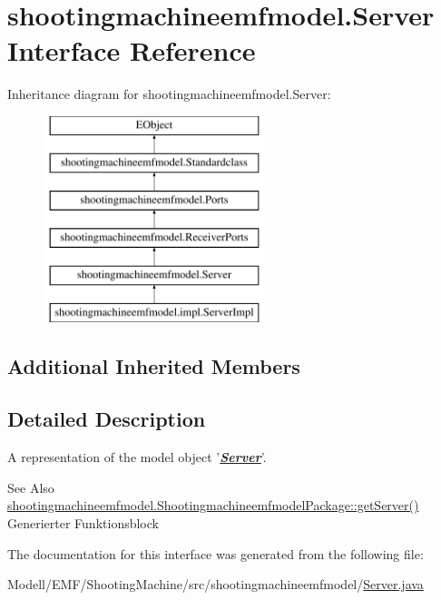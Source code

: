 \hypertarget{interfaceshootingmachineemfmodel_1_1_server}{\section{shootingmachineemfmodel.\-Server Interface Reference}
\label{interfaceshootingmachineemfmodel_1_1_server}
}
Inheritance diagram for shootingmachineemfmodel.\-Server\-:\begin{figure}[H]
\begin{center}
\leavevmode
\includegraphics[height=6.000000cm]{interfaceshootingmachineemfmodel_1_1_server}
\end{center}
\end{figure}
\subsection*{Additional Inherited Members}


\subsection{Detailed Description}
A representation of the model object '{\itshape {\bfseries \hyperlink{interfaceshootingmachineemfmodel_1_1_server}{Server}}}'.

\begin{DoxySeeAlso}{See Also}
\hyperlink{interfaceshootingmachineemfmodel_1_1_shootingmachineemfmodel_package_ac57d5740d707997dff3cb0c1365d1e0e}{shootingmachineemfmodel.\-Shootingmachineemfmodel\-Package\-::get\-Server()}  Generierter Funktionsblock 
\end{DoxySeeAlso}


The documentation for this interface was generated from the following file\-:\begin{DoxyCompactItemize}
\item 
Modell/\-E\-M\-F/\-Shooting\-Machine/src/shootingmachineemfmodel/\hyperlink{_server_8java}{Server.\-java}\end{DoxyCompactItemize}
